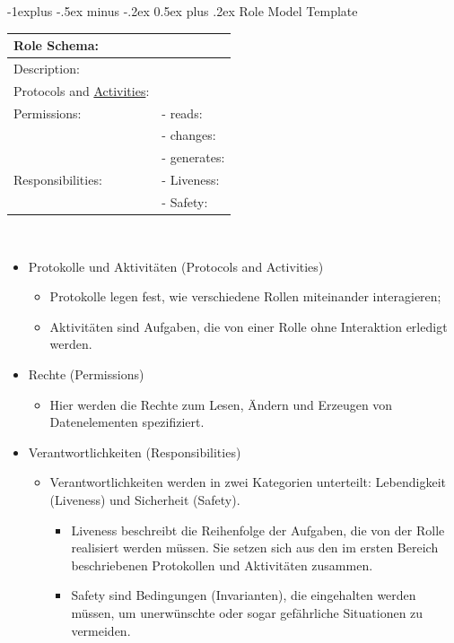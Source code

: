 \documentclass[5pt]{article}
\makeatletter
\renewcommand{\subsection}{\@startsection{subsection}{2}{0mm}%
                                {-1explus -.5ex minus -.2ex}%
                                {0.5ex plus .2ex}%
                                {\normalfont\normalsize\bfseries}}
\makeatother
\begin{document}
\begin{multicols*}{2}
\subsection{Role Model Template}
\begin{tabular}{|l|l|}
    \hline
    Role Schema:&\\
    \hline
    Description:&\\
    \hline
    Protocols and \underline{Activities}: & \\
    \hline
    Permissions:  & - reads:\\
    & - changes:\\
    & - generates:\\
    \hline
    Responsibilities: & - Liveness:\\
    & - Safety:\\
    \hline
\end{tabular}\\
\begin{itemize}
    \item Protokolle und Aktivitäten (Protocols and Activities)
    \begin{itemize}
        \item Protokolle legen fest, wie verschiedene Rollen miteinander interagieren;
        \item Aktivitäten sind Aufgaben, die von einer Rolle ohne Interaktion erledigt werden.
    \end{itemize}
    \item Rechte (Permissions)
    \begin{itemize}
        \item Hier werden die Rechte zum Lesen, Ändern und Erzeugen von Datenelementen spezifiziert.
    \end{itemize}
    \item Verantwortlichkeiten (Responsibilities)
    \begin{itemize}
        \item Verantwortlichkeiten werden in zwei Kategorien unterteilt: Lebendigkeit (Liveness) und Sicherheit (Safety).
        \begin{itemize}
            \item Liveness beschreibt die Reihenfolge der Aufgaben, die von der Rolle realisiert werden müssen. Sie setzen sich aus den im ersten Bereich beschriebenen Protokollen und Aktivitäten
            zusammen.
            \item Safety sind Bedingungen (Invarianten), die eingehalten werden müssen, um unerwünschte
            oder sogar gefährliche Situationen zu vermeiden.
        \end{itemize}
    \end{itemize}
\end{itemize}

\end{multicols*}
\end{document}
